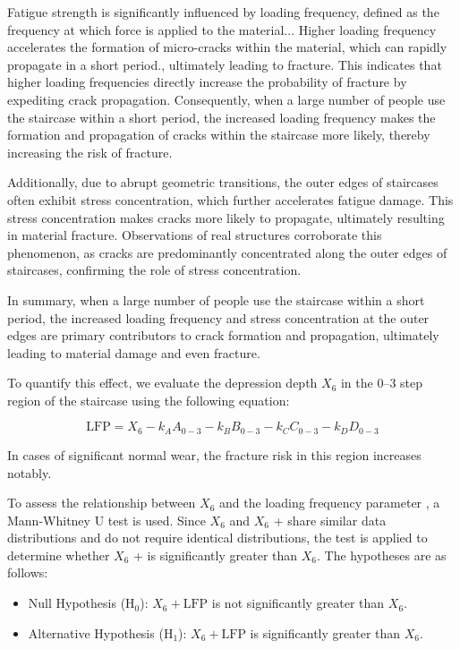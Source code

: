 \documentclass{mcmthesis}
\begin{document}
Fatigue strength is significantly influenced by loading frequency, defined as the frequency at which force is applied to the
material\cite{Yokobori1976}.\cite{Takezono1980}.\cite{HeimbachHeimbach+1970+377+380}. Higher loading frequency accelerates the formation of micro-cracks within the material, which can rapidly propagate in a short
period\cite{ SJESAC88A958454EEE1CD4ED092FB8A0E8F8}.\cite{ SJESF46245B4D88236414B6977C781CEC048}, ultimately leading to fracture. This indicates that higher loading frequencies directly increase the probability of fracture by expediting crack propagation. Consequently, when a large number of people use the staircase within a short period, the increased loading frequency makes the formation and propagation of cracks within the staircase more likely, thereby increasing the risk of fracture.

Additionally, due to abrupt geometric transitions, the outer edges of staircases often exhibit stress concentration, which further accelerates fatigue damage. This stress concentration makes cracks more likely to propagate, ultimately resulting in material fracture. Observations of real structures corroborate this phenomenon, as cracks are predominantly concentrated along the outer edges of staircases, confirming the role of stress concentration.

In summary, when a large number of people use the staircase within a short period, the increased loading frequency and stress concentration at the outer edges are primary contributors to crack formation and propagation, ultimately leading to material damage and even fracture.

To quantify this effect, we evaluate the depression depth $X_6$ in the 0–3 step region of the staircase using the following equation:


\[\text{LFP} = X_6 - k_A A_{0-3} - k_B B_{0-3} - k_C C_{0-3} - k_D D_{0-3}\]


In cases of significant normal wear, the fracture risk in this region increases notably. 

To assess the relationship between $X_6$ and the loading frequency parameter , a Mann-Whitney U test is used. Since $X_6$ and $X_6$ +  share similar data distributions and do not require identical distributions, the test is applied to determine whether $X_6$ +  is significantly greater than $X_6$. The hypotheses are as follows:


\begin{itemize} 
\item Null Hypothesis (H\(_0\)): \(X_6 + \text{LFP}\) is not significantly greater than \(X_6\). 
\item Alternative Hypothesis (H\(_1\)): \(X_6 + \text{LFP}\) is significantly greater than \(X_6\). 
\end{itemize}
\end{document}
